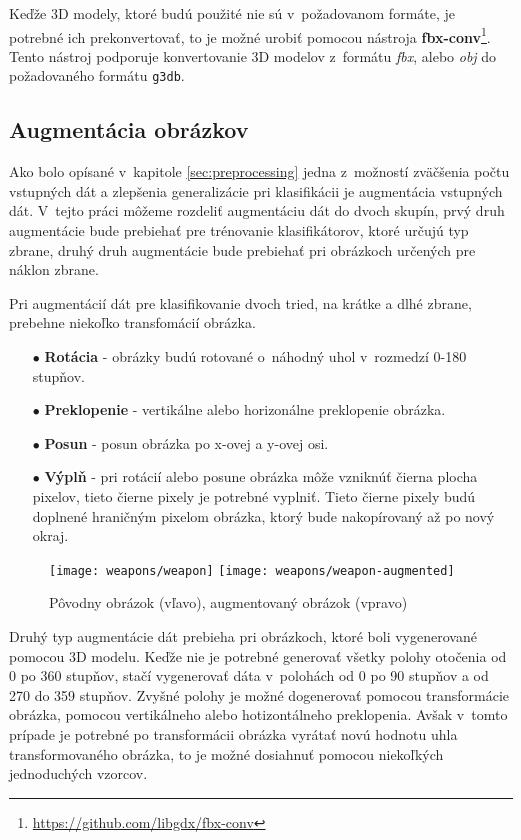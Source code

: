 Keďže 3D modely, ktoré budú použité nie sú v~požadovanom formáte, je potrebné ich prekonvertovať, to je možné urobiť
    pomocou nástroja \textbf{fbx-conv}\footnote{\url{https://github.com/libgdx/fbx-conv}}.
Tento nástroj podporuje konvertovanie 3D modelov z~formátu \textit{fbx}, alebo \textit{obj} do požadovaného formátu \texttt{g3db}.

\subsection{Augmentácia obrázkov}
\label{subsec:augmentacia}
Ako bolo opísané v~kapitole \ref{sec:preprocessing} jedna z~možností zväčšenia počtu vstupných dát a zlepšenia generalizácie pri klasifikácii je augmentácia vstupných dát.
V~tejto práci môžeme rozdeliť augmentáciu dát do dvoch skupín, prvý druh augmentácie bude prebiehať pre trénovanie klasifikátorov, ktoré
    určujú typ zbrane, druhý druh augmentácie bude prebiehať pri obrázkoch určených pre náklon zbrane.

Pri augmentácií dát pre klasifikovanie dvoch tried, na krátke a dlhé zbrane, prebehne niekoľko transfomácií obrázka.
\begin{enumerate}
    \item[$\bullet$] \textbf{Rotácia} - obrázky budú rotované o~náhodný uhol v~rozmedzí 0-180 stupňov.
    \item[$\bullet$] \textbf{Preklopenie} - vertikálne alebo horizonálne preklopenie obrázka.
    \item[$\bullet$] \textbf{Posun} - posun obrázka po x-ovej a y-ovej osi.
    \item[$\bullet$] \textbf{Výplň} - pri rotácií alebo posune obrázka môže vzniknúť čierna plocha pixelov, tieto čierne pixely je potrebné vyplniť.
    Tieto čierne pixely budú doplnené hraničným pixelom obrázka, ktorý bude nakopírovaný až po nový okraj.
\end{enumerate}

\begin{figure}[H]
    \centering
    \texttt{[image: weapons/weapon]}
    \qquad
    \texttt{[image: weapons/weapon-augmented]}
    \caption{Pôvodny obrázok (vľavo), augmentovaný obrázok (vpravo)}
    \label{pic:imageAugmented}
\end{figure}

Druhý typ augmentácie dát prebieha pri obrázkoch, ktoré boli vygenerované pomocou 3D modelu.
Keďže nie je potrebné generovať všetky polohy otočenia od 0 po 360 stupňov, stačí vygenerovať dáta v~polohách od 0 po 90 stupňov a od 270 do 359 stupňov.
Zvyšné polohy je možné dogenerovať pomocou transformácie obrázka, pomocou vertikálneho alebo hotizontálneho preklopenia.
Avšak v~tomto prípade je potrebné po transformácii obrázka vyrátať novú hodnotu uhla transformovaného obrázka, to je možné dosiahnuť pomocou niekoľkých
    jednoduchých vzorcov.

